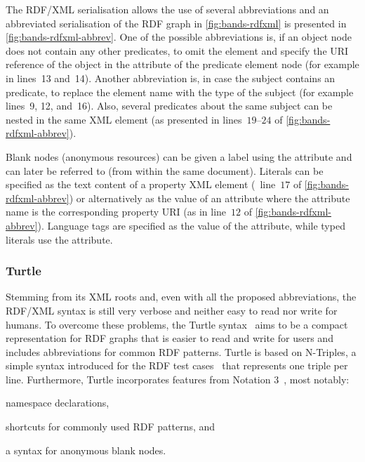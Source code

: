 The RDF/XML serialisation allows the use of several abbreviations and 
%
an abbreviated serialisation of the \ac{RDF} graph in \cref{fig:bands-rdfxml} is presented in
\cref{fig:bands-rdfxml-abbrev}. 
%
One of the possible abbreviations is, if an object node does not contain any other predicates, to omit the
 element and specify the URI reference of the object in the
 attribute of the predicate element node (for example in lines~13 and~14). 
%
Another abbreviation is, in case the subject contains an  predicate, to replace the
 element name with the type of the subject (for example lines~9, 12, and~16).
%
Also, several predicates about the same subject can be nested in the same \ac{XML} element (as presented in
lines~$19$--$24$ of \cref{fig:bands-rdfxml-abbrev}).
%


Blank nodes (anonymous resources) can be given a label using the  attribute and can
later be referred to (from within the same document).
%
Literals can be specified as the text content of a property \ac{XML} element (\eg~line~$17$ of
\cref{fig:bands-rdfxml-abbrev}) or alternatively as the value of an attribute where the attribute name is the
corresponding property \ac{URI} (as in line~$12$ of \cref{fig:bands-rdfxml-abbrev}).
%
Language tags are specified as the value of the  attribute, while typed literals use the
 attribute.




\subsubsection{Turtle}
\label{sec:turtle}
%

Stemming from its \ac{XML} roots and, even with all the proposed abbreviations, the RDF/XML syntax is still very verbose
and neither easy to read nor write for humans.
%
To overcome these problems, the Turtle syntax~\cite{BeckettBerners-Lee:2008aa} aims to be a compact representation for
\ac{RDF} graphs that is easier to read and write for users and includes abbreviations for common \ac{RDF} patterns.
%
Turtle is based on N-Triples, a simple syntax introduced for the \ac{RDF} test cases~\cite{GrantBeckett:2004aa} that
represents one triple per line.  Furthermore, Turtle incorporates features from Notation 3~\cite{Berners-Lee:2005aa},
most notably:
%
\begin{inparaenum}[(i)]
\item namespace declarations,
\item shortcuts for commonly used \ac{RDF} patterns, and
\item a syntax for anonymous blank nodes.
\end{inparaenum}

